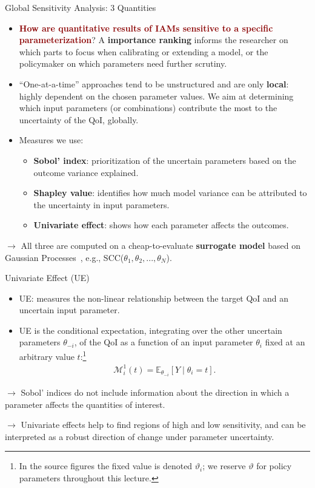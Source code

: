 \documentclass[10pt,aspectratio=169]{beamer}
\newcommand{\emphc}[1]{\textbf{\textcolor{darkred}{#1}}}
\newcommand{\key}[1]{\textbf{\textcolor{uzhblue}{#1}}}
\newcommand{\keyc}[1]{\textcolor{uzhblue}{#1}}
\begin{document}
\begin{frame}{Global Sensitivity Analysis: 3 Quantities}
\small
\begin{itemize}\itemsep3pt
    \item \textbf{\emphc{How are quantitative results of IAMs sensitive to a specific parameterization}}? A \key{importance ranking} informs the researcher on which parts to focus when calibrating or extending a model, or the policymaker on which parameters need further scrutiny.
    \item ``One-at-a-time'' approaches tend to be unstructured and are only \textbf{local}: highly dependent on the chosen parameter values. We aim at determining which input parameters (or combinations) contribute the most to the uncertainty of the QoI, globally.
	\item Measures we use:
	\begin{itemize}
	    \item \keyc{\textbf{Sobol' index}: prioritization of the uncertain parameters based on the outcome variance explained}.
        \item \keyc{\textbf{Shapley value}: identifies how much model variance can be attributed to the uncertainty in input parameters}.
        \item \keyc{\textbf{Univariate effect}: shows how each parameter affects the outcomes}.
	\end{itemize}
\end{itemize}
$\rightarrow$ All three are computed on a cheap-to-evaluate \textbf{surrogate model} based on Gaussian Processes~\citep{scheideggerbilinois_2019}, e.g., SCC($\theta_1, \theta_2,...,\theta_N$).
\end{frame}

\begin{frame}{Univariate Effect (UE)}
\small
\begin{itemize}\itemsep4pt
 \item UE: measures the non-linear relationship between the target QoI and an uncertain input parameter.
    \item UE is the conditional expectation, integrating over the other uncertain parameters $\theta_{-i}$, of the QoI as a function of an input parameter $\theta_{i}$ fixed at an arbitrary value $t$:\footnote{In the source figures the fixed value is denoted $\vartheta_i$; we reserve $\vartheta$ for policy parameters throughout this lecture.}
\begin{align*}
  \mathcal{M}^{ 1 }_{i}\left( t \right) =
  \mathbb{E}_{\theta_{-i}}\left[ Y \mid \theta_{i}=t  \right].
\end{align*}
\end{itemize}
\vspace{0.3em}
$\rightarrow$ Sobol' indices do not include information about the direction in which a parameter affects the quantities of interest.

$\rightarrow$ Univariate effects help to find regions of high and low sensitivity, and can be interpreted as a robust direction of change under parameter uncertainty.
\end{frame}
\end{document}
